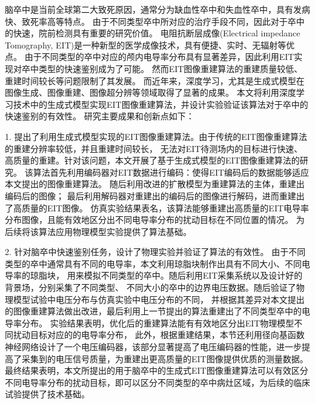 
\begin{chineseabstract}

    脑卒中是当前全球第二大致死原因，通常分为缺血性卒中和失血性卒中，具有发病快、致死率高等特点。
    由于不同类型卒中所对应的治疗手段不同，因此对于卒中的快速，院前检测具有重要的研究价值。
    电阻抗断层成像(Electrical impedance Tomography, EIT)是一种新型的医学成像技术，具有便捷、实时、无辐射等优点。
    由于不同类型的卒中对应的颅内电导率分布具有显著差异，因此利用EIT实现对卒中类型的快速鉴别成为了可能。
    然而EIT图像重建算法的重建质量较低、重建时间较长等问题限制了其发展。
    而近年来，深度学习，尤其是生成式模型在图像生成、图像重建、图像超分辨等领域取得了显著的成果。
    本文将利用深度学习技术中的生成式模型实现EIT图像重建算法，并设计实验验证该算法对于卒中的快速鉴别的有效性。
    研究主要成果和创新点如下：

    1. 提出了利用生成式模型实现的EIT图像重建算法。由于传统的EIT图像重建算法的重建分辨率较低，并且重建时间较长，
    无法对EIT待测场内的目标进行快速、高质量的重建。针对该问题，本文开展了基于生成式模型的EIT图像重建算法的研究。
    该算法首先利用编码器对EIT数据进行编码：使得EIT编码后的数据能够适应本文提出的图像重建算法。
    随后利用改进的扩散模型为重建算法的主体，重建出编码后的图像；
    最后利用解码器对重建出的编码后的图像进行解码，进而重建出了高质量的EIT图像。
    仿真实验结果表名，该算法能够重建出高质量的EIT电导率分布图像，且能有效地区分出不同电导率分布的扰动目标在不同位置的情况。
    为后续将该算法应用物理模型实验提供了算法基础。
    
 
    2. 针对脑卒中快速鉴别任务，设计了物理实验并验证了算法的有效性。
    由于不同类型的卒中通常具有不同的电导率，本文利用琼脂块制作出具有不同大小、不同电导率的琼脂块，
    用来模拟不同类型的卒中。随后利用EIT采集系统以及设计好的背景场，分别采集了不同类型、
    不同大小的卒中的边界电压数据。随后验证了物理模型试验中电压分布与仿真实验中电压分布的不同，
    并根据其差异对本文提出的图像重建算法做出改进，最后利用上一节提出的算法重建出了不同类型卒中的电导率分布。
    实验结果表明，优化后的重建算法能有有效地区分出EIT物理模型不同扰动目标对应的的电导率分布，
    此外，根据重建结果，本节还利用径向基函数神经网络设计了一个电压编码器，该部分显著提高了电压编码器的性能，进一步提高了采集到的电压信号质量，为重建出更高质量的EIT图像提供优质的测量数据。
    最终结果表明，本文所提出的用于脑卒中的生成式EIT图像重建算法可以有效区分不同电导率分布的扰动目标，即可以区分不同类型的卒中病灶区域，为后续的临床试验提供了技术基础。






\end{chineseabstract}

